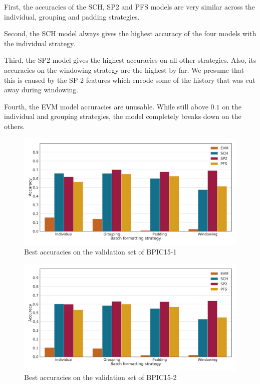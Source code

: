 First, the accuracies of the SCH, SP2 and PFS models are very similar across the individual, grouping and padding strategies.

Second, the SCH model always gives the highest accuracy of the four models with the individual strategy.

Third, the SP2 model gives the highest accuracies on all other strategies.
Also, its accuracies on the windowing strategy are the highest by far.
We presume that this is caused by the SP-2 features which encode some of the history that was cut away during windowing.

Fourth, the EVM model accuracies are unusable. While still above $0.1$ on the individual and grouping strategies, the model completely breaks down on the others.

\begin{figure}[!htb]
    \centering
    \includegraphics[width=\textwidth]{gfx/bpic2015_1/accuracies.pdf}
    \caption{Best accuracies on the validation set of BPIC15-1}
    \label{fig:max-accuracies-bpic2015-1}
\end{figure}
\begin{figure}[!htb]
    \centering
    \includegraphics[width=\textwidth]{gfx/bpic2015_2/accuracies.pdf}
    \caption{Best accuracies on the validation set of BPIC15-2}
    \label{fig:max-accuracies-bpic2015-2}
\end{figure}
